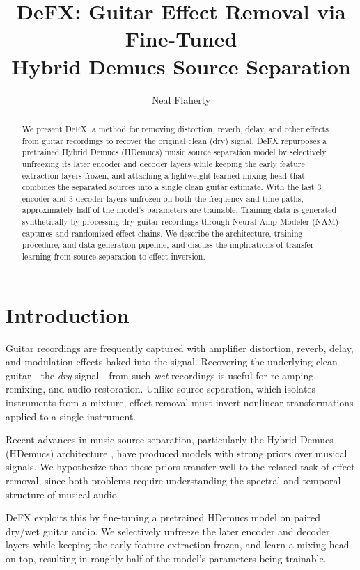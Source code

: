 \documentclass[11pt,twocolumn]{article}
\title{DeFX: Guitar Effect Removal via Fine-Tuned\\Hybrid Demucs Source Separation}
\author{Neal Flaherty}
\date{}
\begin{document}
\maketitle

\begin{abstract}
We present DeFX, a method for removing distortion, reverb, delay, and other effects from guitar recordings to recover the original clean (dry) signal. DeFX repurposes a pretrained Hybrid Demucs (HDemucs) music source separation model by selectively unfreezing its later encoder and decoder layers while keeping the early feature extraction layers frozen, and attaching a lightweight learned mixing head that combines the separated sources into a single clean guitar estimate. With the last 3 encoder and 3 decoder layers unfrozen on both the frequency and time paths, approximately half of the model's parameters are trainable. Training data is generated synthetically by processing dry guitar recordings through Neural Amp Modeler (NAM) captures and randomized effect chains. We describe the architecture, training procedure, and data generation pipeline, and discuss the implications of transfer learning from source separation to effect inversion.
\end{abstract}

\section{Introduction}

Guitar recordings are frequently captured with amplifier distortion, reverb, delay, and modulation effects baked into the signal. Recovering the underlying clean guitar---the \emph{dry} signal---from such \emph{wet} recordings is useful for re-amping, remixing, and audio restoration. Unlike source separation, which isolates instruments from a mixture, effect removal must invert nonlinear transformations applied to a single instrument.

Recent advances in music source separation, particularly the Hybrid Demucs (HDemucs) architecture \cite{defossez2021hybrid, rouard2023hybrid}, have produced models with strong priors over musical signals. We hypothesize that these priors transfer well to the related task of effect removal, since both problems require understanding the spectral and temporal structure of musical audio.

DeFX exploits this by fine-tuning a pretrained HDemucs model on paired dry/wet guitar audio. We selectively unfreeze the later encoder and decoder layers while keeping the early feature extraction frozen, and learn a mixing head on top, resulting in roughly half of the model's parameters being trainable.
\end{document}
